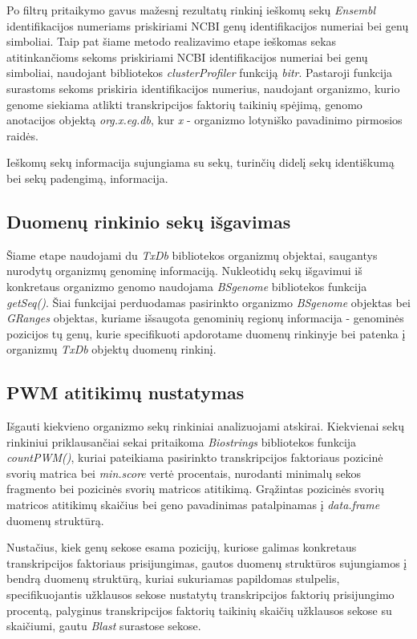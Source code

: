 \documentclass[12pt]{article}
\begin{document}
Po filtrų pritaikymo gavus mažesnį rezultatų rinkinį ieškomų sekų \emph{Ensembl}
identifikacijos numeriams priskiriami NCBI genų identifikacijos numeriai bei
genų simboliai. Taip pat šiame metodo realizavimo etape ieškomas sekas
atitinkančioms sekoms priskiriami NCBI identifikacijos numeriai bei genų
simboliai, naudojant bibliotekos \emph{clusterProfiler}\cite{CLUSTERPROFILER}
funkciją \emph{bitr}. Pastaroji funkcija surastoms sekoms priskiria
identifikacijos numerius, naudojant organizmo, kurio genome siekiama atlikti
transkripcijos faktorių taikinių spėjimą, genomo anotacijos objektą
\emph{org.x.eg.db}, kur \emph{x} - organizmo lotyniško pavadinimo pirmosios
raidės.

Ieškomų sekų informacija sujungiama su sekų, turinčių didelį sekų identiškumą
bei sekų padengimą, informacija.

\subsection{Duomenų rinkinio sekų išgavimas}
Šiame etape naudojami du \emph{TxDb} bibliotekos organizmų objektai,
saugantys nurodytų or\-ga\-niz\-mų genominę informaciją. Nukleotidų sekų
išgavimui iš konkretaus organizmo genomo naudojama \emph{BSgenome} bibliotekos
funkcija \emph{getSeq()}. Šiai funkcijai perduodamas pasirinkto organizmo
\emph{BSgenome} objektas bei \emph{GRanges} objektas, kuriame išsaugota
genominių regionų informacija - genominės pozicijos tų genų, kurie specifikuoti
apdorotame duomenų rinkinyje bei patenka į organizmų \emph{TxDb} objektų duomenų
rinkinį.

\subsection{PWM atitikimų nustatymas}
Išgauti kiekvieno organizmo sekų rinkiniai analizuojami atskirai. Kiekvienai
sekų rinkiniui priklausančiai sekai pritaikoma
\emph{Biostrings}\cite{BIOSTRINGS} bibliotekos
funkcija \emph{countPWM()}, kuriai pateikiama pasirinkto transkripcijos
faktoriaus pozicinė svorių matrica bei \emph{min.score} vertė procentais,
nurodanti minimalų sekos fragmento bei pozicinės svorių matricos atitikimą.
Grąžintas pozicinės svorių matricos atitikimų skaičius bei geno pavadinimas
patalpinamas į \emph{data.frame} duomenų struktūrą.

Nustačius, kiek genų sekose esama pozicijų, kuriose galimas konkretaus
transkripcijos faktoriaus prisijungimas, gautos duomenų struktūros sujungiamos
į bendrą duomenų struktūrą, kuriai sukuriamas papildomas stulpelis,
specifikuojantis užklausos sekose nustatytų transkripcijos faktorių
prisijungimo procentą, palyginus transkripcijos faktorių taikinių skaičių
užklausos sekose su skaičiumi, gautu \emph{Blast} surastose sekose. 
\end{document}
